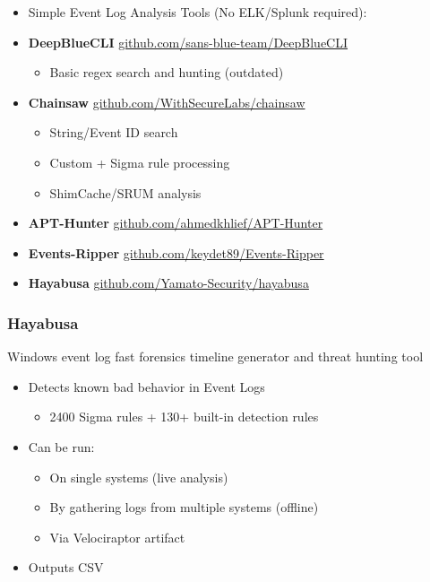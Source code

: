 \begin{itemize}
\item Simple Event Log Analysis Tools (No ELK/Splunk required):

\item \textbf{DeepBlueCLI} \href{https://github.com/sans-blue-team/DeepBlueCLI}{github.com/sans-blue-team/DeepBlueCLI}
    \begin{itemize}
        \item Basic regex search and hunting (outdated)
    \end{itemize}

\item \textbf{Chainsaw} \href{https://github.com/WithSecureLabs/chainsaw}{github.com/WithSecureLabs/chainsaw}
    \begin{itemize}
        \item String/Event ID search
        \item Custom + Sigma rule processing
        \item ShimCache/SRUM analysis
    \end{itemize}

\item \textbf{APT-Hunter} \href{https://github.com/ahmedkhlief/APT-Hunter}{github.com/ahmedkhlief/APT-Hunter}

\item \textbf{Events-Ripper} \href{https://github.com/keydet89/Events-Ripper}{github.com/keydet89/Events-Ripper}

\item \textbf{Hayabusa} \href{https://github.com/Yamato-Security/hayabusa}{github.com/Yamato-Security/hayabusa}
\end{itemize}

\subsubsection*{Hayabusa}
Windows event log fast forensics timeline generator and threat hunting tool

\begin{itemize}
\item Detects known bad behavior in Event Logs
    \begin{itemize}
        \item 2400 Sigma rules + 130+ built-in detection rules
    \end{itemize}
    
\item Can be run:
    \begin{itemize}
        \item On single systems (live analysis)
        \item By gathering logs from multiple systems (offline)
        \item Via Velociraptor artifact
    \end{itemize}

\item Outputs CSV
\end{itemize}

